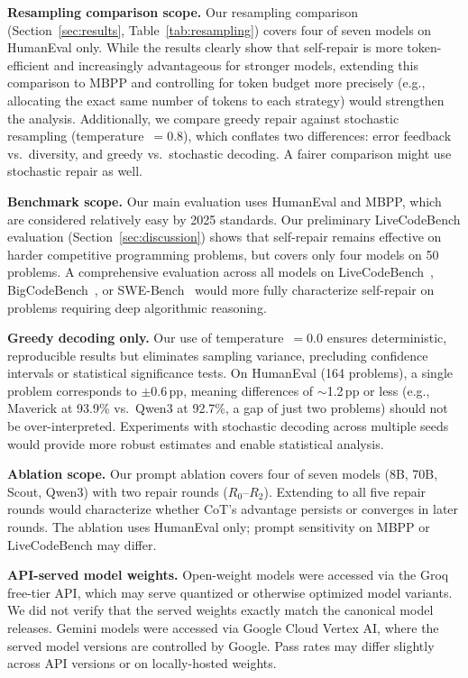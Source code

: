 \documentclass[conference]{IEEEtran}
\begin{document}
\textbf{Resampling comparison scope.}
Our resampling comparison (Section~\ref{sec:results}, Table~\ref{tab:resampling}) covers four of seven models on HumanEval only. While the results clearly show that self-repair is more token-efficient and increasingly advantageous for stronger models, extending this comparison to MBPP and controlling for token budget more precisely (e.g., allocating the exact same number of tokens to each strategy) would strengthen the analysis. Additionally, we compare greedy repair against stochastic resampling (temperature~$=0.8$), which conflates two differences: error feedback vs.\ diversity, and greedy vs.\ stochastic decoding. A fairer comparison might use stochastic repair as well.

\textbf{Benchmark scope.}
Our main evaluation uses HumanEval and MBPP, which are considered relatively easy by 2025 standards. Our preliminary LiveCodeBench evaluation (Section~\ref{sec:discussion}) shows that self-repair remains effective on harder competitive programming problems, but covers only four models on 50 problems. A comprehensive evaluation across all models on LiveCodeBench~\cite{jain2024livecodebench}, BigCodeBench~\cite{zhuo2024bigcodebench}, or SWE-Bench~\cite{jimenez2024swebench} would more fully characterize self-repair on problems requiring deep algorithmic reasoning.

\textbf{Greedy decoding only.}
Our use of temperature~$=0.0$ ensures deterministic, reproducible results but eliminates sampling variance, precluding confidence intervals or statistical significance tests. On HumanEval (164 problems), a single problem corresponds to $\pm$0.6\,pp, meaning differences of $\sim$1.2\,pp or less (e.g., Maverick at 93.9\% vs.\ Qwen3 at 92.7\%, a gap of just two problems) should not be over-interpreted. Experiments with stochastic decoding across multiple seeds would provide more robust estimates and enable statistical analysis.

\textbf{Ablation scope.}
Our prompt ablation covers four of seven models (8B, 70B, Scout, Qwen3) with two repair rounds ($R_0$--$R_2$). Extending to all five repair rounds would characterize whether CoT's advantage persists or converges in later rounds. The ablation uses HumanEval only; prompt sensitivity on MBPP or LiveCodeBench may differ.

\textbf{API-served model weights.}
Open-weight models were accessed via the Groq free-tier API, which may serve quantized or otherwise optimized model variants. We did not verify that the served weights exactly match the canonical model releases. Gemini models were accessed via Google Cloud Vertex AI, where the served model versions are controlled by Google. Pass rates may differ slightly across API versions or on locally-hosted weights.
\end{document}
